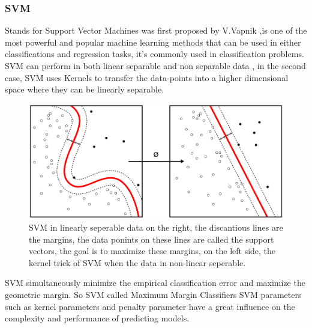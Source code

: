 \subsubsection{SVM}
Stands for Support Vector Machines was first proposed by V.Vapnik \cite{vapnik},is one of
the most powerful and popular machine learning methods that can be used in either
classifications and regression tasks, it’s commonly used in classification problems. SVM
can perform in both linear separable and non separable data , in the second case, SVM
uses Kernels to transfer the data-points into a higher dimensional space where they can
be linearly separable.
\begin{figure}[!h]
    \centering
    \includegraphics[width=1\textwidth]{chapters/chapter02/fig02/svm.png}
    \caption{SVM in linearly seperable data on the right, the discantious lines are the
margins, the data ponints on these lines are called the support vectors, the goal is to
maximize these margins, on the left side, the kernel trick of SVM when the data in
non-linear seperable.
}
    \label{fig:my_label}
\end{figure}
SVM simultaneously minimize the empirical classification error and maximize the
geometric margin. So SVM called Maximum Margin Classifiers \cite{book5} SVM parameters
such as kernel parameters and penalty parameter have a great influence on the complexity
and performance of predicting models.
